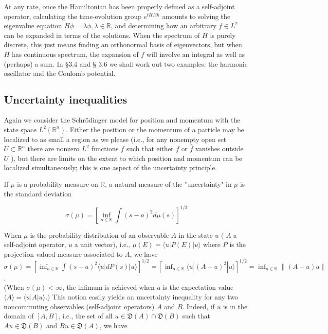 \documentclass[10pt, letterpaper]{article}
\begin{document}
At any rate, once the Hamiltonian has been properly defined as a self-adjoint operator, calculating the time-evolution group $e^{t H / i \hbar}$ amounts to solving the eigenvalue equation $H \phi=\lambda \phi, \lambda \in \mathbb{R}$, and determining how an arbitrary $f \in L^{2}$ can be expanded in terms of the solutions. When the spectrum of $H$ is purely discrete, this just means finding an orthonormal basis of eigenvectors, but when $H$ has continuous spectrum, the expansion of $f$ will involve an integral as well as (perhaps) a sum. In §3.4 and § 3.6 we shall work out two examples: the harmonic oscillator and the Coulomb potential.

\subsection*{Uncertainty inequalities}
Again we consider the Schrödinger model for position and momentum with the state space $L^{2}\left(\mathbb{R}^{n}\right)$. Either the position or the momentum of a particle may be localized to as small a region as we please (i.e., for any nonempty open set $U \subset \mathbb{R}^{n}$ there are nonzero $L^{2}$ functions $f$ such that either $f$ or $\widehat{f}$ vanishes outside $U$ ), but there are limits on the extent to which position and momentum can be localized simultaneously; this is one aspect of the uncertainty principle.

If $\mu$ is a probability measure on $\mathbb{R}$, a natural measure of the "uncertainty" in $\mu$ is the standard deviation

$$
\sigma(\mu)=\left[\inf _{a \in \mathbb{R}} \int(s-a)^{2} d \mu(s)\right]^{1 / 2}
$$

When $\mu$ is the probability distribution of an observable $A$ in the state $u$ ( $A$ a self-adjoint operator, $u$ a unit vector), i.e., $\mu(E)=\langle u| P(E)|u\rangle$ where $P$ is the projection-valued measure associated to $A$, we have\\
$\sigma(\mu)=\left[\inf _{a \in \mathbb{R}} \int(s-a)^{2}\langle u| d P(s)|u\rangle\right]^{1 / 2}=\left[\inf _{a \in \mathbb{R}}\langle u|(A-a)^{2}|u\rangle\right]^{1 / 2}=\inf _{a \in \mathbb{R}}\|(A-a) u\|$.\\
(When $\sigma(\mu)<\infty$, the infimum is achieved when $a$ is the expectation value $\langle A\rangle= \langle u| A|u\rangle$.) This notion easily yields an uncertainty inequality for any two noncommuting observables (self-adjoint operators) $A$ and $B$. Indeed, if $u$ is in the domain of $[A, B]$, i.e., the set of all $u \in \mathfrak{D}(A) \cap \mathfrak{D}(B)$ such that $A u \in \mathfrak{D}(B)$ and $B u \in \mathfrak{D}(A)$, we have
\end{document}
